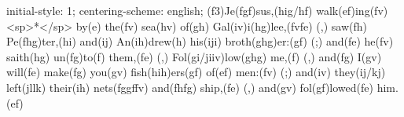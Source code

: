 initial-style: 1;
centering-scheme: english;
(f3)Je(fgf)sus,(hig/hf) walk(ef)ing(fv) <sp>*</sp> by(e) the(fv) sea(hv) of(gh) Gal(iv)i(hg)lee,(fvfe) (,) saw(fh) Pe(fhg)ter,(hi) and(ij) An(ih)drew(h) his(iji) broth(ghg)er:(gf) (;) and(fe) he(fv) saith(hg) un(fg)to(f) them,(fe) (,) Fol(gi/jiiv)low(ghg) me,(f) (,) and(fg) I(gv) will(fe) make(fg) you(gv) fish(hih)ers(gf) of(ef) men:(fv) (;) and(iv) they(ij/kj) left(jllk) their(ih) nets(fggffv) and(fhfg) ship,(fe) (,) and(gv) fol(gf)lowed(fe) him.(ef)
